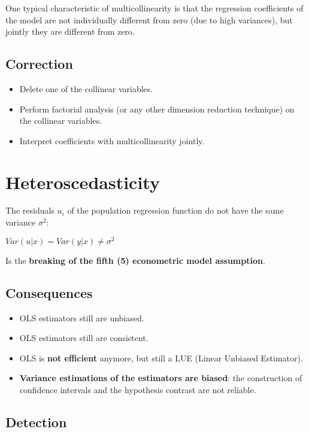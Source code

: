 \documentclass[10pt, a4paper, landscape]{extarticle}
\begin{document}
\begin{multicols}{3}
One typical characteristic of multicollinearity is that the regression coefficients of the model are not individually different from zero (due to high variances), but jointly they are different from zero.

\subsection*{Correction}

\begin{itemize}[leftmargin=*]
\item Delete one of the collinear variables.
\item Perform factorial analysis (or any other dimension reduction technique) on the collinear variables.
\item Interpret coefficients with multicollinearity jointly.
\end{itemize}

\columnbreak

\section*{Heteroscedasticity}

The residuals $u_i$ of the population regression function do not have the same variance $\sigma^2$:

\begin{center}
$Var(u|x) = Var(y|x) \neq \sigma^2$
\end{center}

Is the \textbf{breaking of the fifth (5) econometric model assumption}.

\subsection*{Consequences}

\begin{itemize}[leftmargin=*]
\item OLS estimators still are unbiased.
\item OLS estimators still are consistent.
\item OLS is \textbf{not efficient} anymore, but still a LUE (Linear Unbiased Estimator).
\item \textbf{Variance estimations of the estimators are biased}: the construction of confidence intervals and the hypothesis contrast are not reliable.
\end{itemize}

\subsection*{Detection}


\end{multicols}
\end{document}
